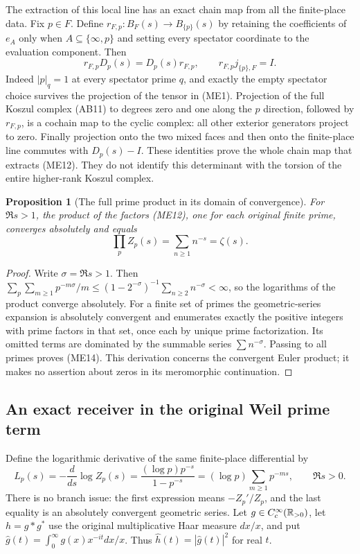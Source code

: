 \documentclass[11pt,a4paper]{article}
\newtheorem{proposition}[theorem]{Proposition}
\theoremstyle{definition}\newtheorem{definition}[theorem]{Definition}
\begin{document}
The extraction of this local line has an exact chain map from all the
finite-place data. Fix $p\in F$. Define
$r_{F,p}:B_F(s)\to B_{\{p\}}(s)$ by retaining the coefficients of
$e_A$ only when $A\subseteq\{\infty,p\}$ and setting every spectator
coordinate to the evaluation component. Then
\[
 r_{F,p}D_p(s)=D_p(s)r_{F,p},\qquad
 r_{F,p}j_{\{p\},F}=I.
 \tag{ME13}
\]
Indeed $|p|_q=1$ at every spectator prime $q$, and exactly the empty
spectator choice survives the projection of the tensor in (ME1).
Projection of the full Koszul complex (AB11) to degrees zero and one
along the $p$ direction, followed by $r_{F,p}$, is a cochain map to
the cyclic complex: all other exterior generators project to zero.
Finally projection onto the two mixed faces and then onto the finite-place
line commutes with $D_p(s)-I$. These identities prove the whole chain map
that extracts (ME12). They do not identify this determinant with the
torsion of the entire higher-rank Koszul complex.

\begin{proposition}[The full prime product in its domain of convergence]
For $\Re s>1$, the product of the factors (ME12), one for each original
finite prime, converges absolutely and equals
\[
 \prod_p Z_p(s)=\sum_{n\ge1}n^{-s}=\zeta(s).
 \tag{ME14}
\]
\end{proposition}
\begin{proof}
Write $\sigma=\Re s>1$. Then
$\sum_p\sum_{m\ge1}p^{-m\sigma}/m
\le(1-2^{-\sigma})^{-1}\sum_{n\ge2}n^{-\sigma}<\infty$,
so the logarithms of the product converge absolutely.
For a finite set of primes the geometric-series expansion is absolutely
convergent and enumerates exactly the positive integers with prime factors
in that set, once each by unique prime factorization. Its omitted terms
are dominated by the summable series $\sum n^{-\sigma}$. Passing to all
primes proves (ME14). This derivation concerns the convergent Euler
product; it makes no assertion about zeros in its meromorphic continuation.
\end{proof}

\subsection{An exact receiver in the original Weil prime term}
Define the logarithmic derivative of the same finite-place differential by
\[
 L_p(s)=-\frac{d}{ds}\log Z_p(s)
 =\frac{(\log p)p^{-s}}{1-p^{-s}}
 =(\log p)\sum_{m\ge1}p^{-ms},\qquad\Re s>0.
 \tag{ME15}\label{eq:ME-log-derivative}
\]
There is no branch issue: the first expression means $-Z_p'/Z_p$,
and the last equality is an absolutely convergent geometric series.
Let $g\in C_c^\infty(\mathbb R_{>0})$, let $h=g*g^*$ use the original
multiplicative Haar measure $dx/x$, and put
$\widehat g(t)=\int_0^\infty g(x)x^{-it}dx/x$. Thus
$\widehat h(t)=|\widehat g(t)|^2$ for real $t$.
\end{document}
